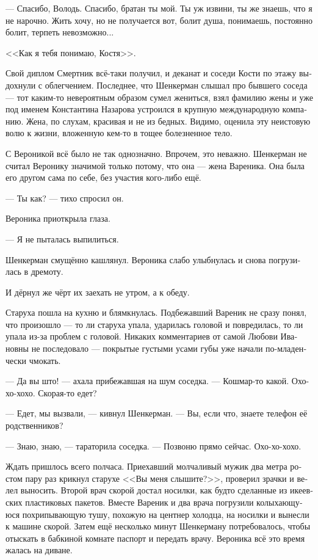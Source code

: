 \documentclass[a5paper,12pt,fleqn]{extbook}\usepackage{cooltooltips}\usepackage{polyglossia}\setdefaultlanguage[babelshorthands=true]{russian}\setotherlanguage{english}\defaultfontfeatures{Ligatures=TeX,Mapping=tex-text} \usepackage{xcolor}\definecolor{lightgray}{HTML}{bbbbbb}\color{lightgray}\newcommand{\ml}[3]{\textenglish{\textcolor{black}{#3}}}
\newcommand{\asterism}{\vspace{1em}{\centering\Large\bfseries$\ast~\ast~\ast$\par}\vspace{1em}}
\begin{document}
--- Спасибо, Володь.
Спасибо, братан ты мой.
Ты уж извини, ты же знаешь, что я не нарочно.
Жить хочу, но не получается вот, болит душа, понимаешь, постоянно болит, терпеть невозможно...

<<Как я тебя понимаю, Костя>>.

Свой диплом Смертник всё-таки получил, и деканат и соседи Кости по этажу выдохнули с облегчением.
Последнее, что Шенкерман слышал про бывшего соседа --- тот каким-то невероятным образом сумел жениться, взял фамилию жены и уже под именем Константина Назарова устроился в крупную международную компанию.
Жена, по слухам, красивая и не из бедных.
Видимо, оценила эту неистовую волю к жизни, вложенную кем-то в тощее болезненное тело.

С Вероникой всё было не так однозначно.
Впрочем, это неважно.
Шенкерман не считал Веронику значимой только потому, что она --- жена Вареника.
Она была его другом сама по себе, без участия кого-либо ещё.

--- Ты как? --- тихо спросил он.

Вероника приоткрыла глаза.

--- Я не пыталась выпилиться.

Шенкерман смущённо кашлянул.
Вероника слабо улыбнулась и снова погрузилась в дремоту.

\asterism

И дёрнул же чёрт их заехать не утром, а к обеду.

Старуха пошла на кухню и блямкнулась.
Подбежавший Вареник не сразу понял, что произошло --- то ли старуха упала, ударилась головой и повредилась, то ли упала из-за проблем с головой.
Никаких комментариев от самой Любови Ивановны не последовало --- покрытые густыми усами губы уже начали по-младенчески чмокать.

--- Да вы што! --- ахала прибежавшая на шум соседка.
--- Кошмар-то какой.
Охо-хо-хохо.
Скорая-то едет?

--- Едет, мы вызвали, --- кивнул Шенкерман.
--- Вы, если что, знаете телефон её родственников?

--- Знаю, знаю, --- тараторила соседка.
--- Позвоню прямо сейчас.
Охо-хо-хохо.

Ждать пришлось всего полчаса.
Приехавший молчаливый мужик два метра ростом пару раз крикнул старухе <<Вы меня слышите?>>, проверил зрачки и велел выносить.
Второй врач скорой достал носилки, как будто сделанные из икеевских пластиковых пакетов.
Вместе Вареник и два врача погрузили колыхающуюся похрипывающую тушу, похожую на центнер холодца, на носилки и вынесли к машине скорой.
Затем ещё несколько минут Шенкерману потребовалось, чтобы отыскать в бабкиной комнате паспорт и передать врачу.
Вероника всё это время жалась на диване.
\end{document}
